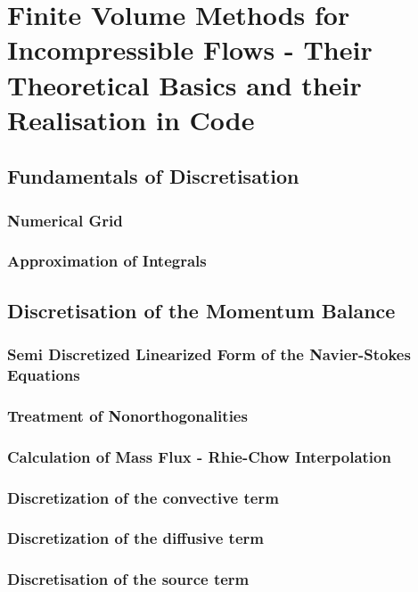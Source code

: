 \documentclass[article,type=msc,colorback,accentcolor=tud2a]{tudthesis}
\begin{document}
  \section{Finite Volume Methods for Incompressible Flows - Their Theoretical Basics and their Realisation in Code}

    \subsection{Fundamentals of Discretisation}
      
      \subsubsection{Numerical Grid}
      \subsubsection{Approximation of Integrals}

    \subsection{Discretisation of the Momentum Balance}
      
      \subsubsection{Semi Discretized Linearized Form of the Navier-Stokes Equations}
      \subsubsection{Treatment of Nonorthogonalities}
      \subsubsection{Calculation of Mass Flux - Rhie-Chow Interpolation}
      \subsubsection{Discretization of the convective term}
      \subsubsection{Discretization of the diffusive term}
      \subsubsection{Discretisation of the source term}
\end{document}
